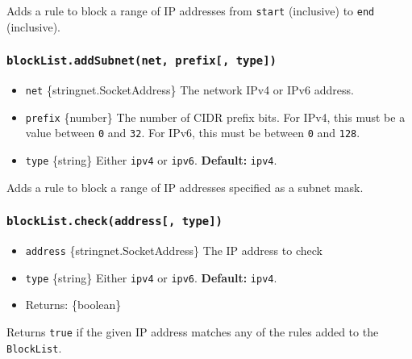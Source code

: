 Adds a rule to block a range of IP addresses from \texttt{start}
(inclusive) to \texttt{end} (inclusive).

\subsubsection{\texorpdfstring{\texttt{blockList.addSubnet(net,\ prefix{[},\ type{]})}}{blockList.addSubnet(net, prefix{[}, type{]})}}\label{blocklist.addsubnetnet-prefix-type}

\begin{itemize}
\tightlist
\item
  \texttt{net} \{string\textbar net.SocketAddress\} The network IPv4 or
  IPv6 address.
\item
  \texttt{prefix} \{number\} The number of CIDR prefix bits. For IPv4,
  this must be a value between \texttt{0} and \texttt{32}. For IPv6,
  this must be between \texttt{0} and \texttt{128}.
\item
  \texttt{type} \{string\} Either
  \texttt{\textquotesingle{}ipv4\textquotesingle{}} or
  \texttt{\textquotesingle{}ipv6\textquotesingle{}}. \textbf{Default:}
  \texttt{\textquotesingle{}ipv4\textquotesingle{}}.
\end{itemize}

Adds a rule to block a range of IP addresses specified as a subnet mask.

\subsubsection{\texorpdfstring{\texttt{blockList.check(address{[},\ type{]})}}{blockList.check(address{[}, type{]})}}\label{blocklist.checkaddress-type}

\begin{itemize}
\tightlist
\item
  \texttt{address} \{string\textbar net.SocketAddress\} The IP address
  to check
\item
  \texttt{type} \{string\} Either
  \texttt{\textquotesingle{}ipv4\textquotesingle{}} or
  \texttt{\textquotesingle{}ipv6\textquotesingle{}}. \textbf{Default:}
  \texttt{\textquotesingle{}ipv4\textquotesingle{}}.
\item
  Returns: \{boolean\}
\end{itemize}

Returns \texttt{true} if the given IP address matches any of the rules
added to the \texttt{BlockList}.

